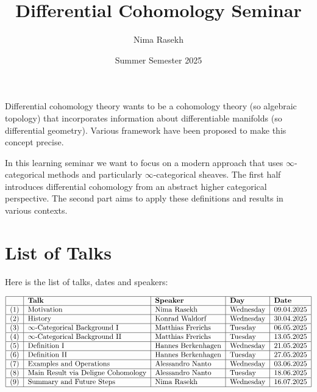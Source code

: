 \documentclass[10pt]{amsart}
\title{Differential Cohomology Seminar}
\date{Summer Semester 2025}
\author{Nima Rasekh}
\begin{document}
\maketitle


Differential cohomology theory wants to be a cohomology theory (so algebraic topology) that incorporates information about differentiable manifolds (so differential geometry). Various framework have been proposed to make this concept precise.

In this learning seminar we want to focus on a modern approach that uses $\infty$-categorical methods and particularly $\infty$-categorical sheaves. The first half introduces differential cohomology from an abstract higher categorical perspective. The second part aims to apply these definitions and results in various contexts.

\section{List of Talks}
Here is the list of talks, dates and speakers:

\[
	\begin{tabular}{|l|l|l|l|l|}
		\hline 
		& \textbf{Talk} & \textbf{Speaker} & \textbf{Day} & \textbf{Date} \\ \hline 
		(1) & Motivation & Nima Rasekh & Wednesday & 09.04.2025 \\ \hline 
		(2) & History & Konrad Waldorf & Wednesday & 30.04.2025 \\ \hline
		(3) & $\infty$-Categorical Background I &	Matthias Frerichs  & Tuesday & 06.05.2025 \\ \hline
		(4) & $\infty$-Categorical Background II &	Matthias Frerichs  & Tuesday & 13.05.2025 \\ \hline
		(5) & Definition I & 	Hannes Berkenhagen & Wednesday & 21.05.2025 \\ \hline
		(6) & Definition II & 	Hannes Berkenhagen & Tuesday & 27.05.2025 \\ \hline 
		(7) & Examples and Operations & Alessandro Nanto & Wednesday & 03.06.2025 \\ \hline
		(8) & Main Result via Deligne Cohomology & Alessandro Nanto & Tuesday & 18.06.2025 \\ \hline
		(9) & Summary and Future Steps & Nima Rasekh & Wednesday &  16.07.2025 \\ \hline
	\end{tabular}
\]
\end{document}
